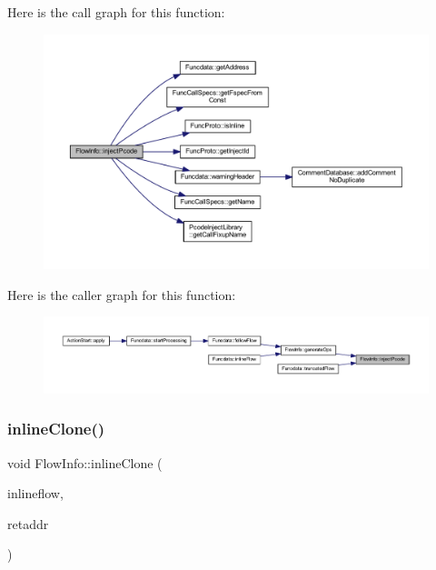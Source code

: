 Here is the call graph for this function\+:
\nopagebreak
\begin{figure}[H]
\begin{center}
\leavevmode
\includegraphics[width=350pt]{class_flow_info_af91718ae694b4852c24f4af6cb0b07a0_cgraph}
\end{center}
\end{figure}
Here is the caller graph for this function\+:
\nopagebreak
\begin{figure}[H]
\begin{center}
\leavevmode
\includegraphics[width=350pt]{class_flow_info_af91718ae694b4852c24f4af6cb0b07a0_icgraph}
\end{center}
\end{figure}
\mbox{\label{class_flow_info_acb0b9cbb6144cd2963c63072d6d72882}} 
\subsubsection{\texorpdfstring{inlineClone()}{inlineClone()}}
{\footnotesize\ttfamily void Flow\+Info\+::inline\+Clone (\begin{DoxyParamCaption}\item[{const \mbox{\hyperlink{class_flow_info}{Flow\+Info}} \&}]{inlineflow,  }\item[{const \mbox{\hyperlink{class_address}{Address}} \&}]{retaddr }\end{DoxyParamCaption})}



